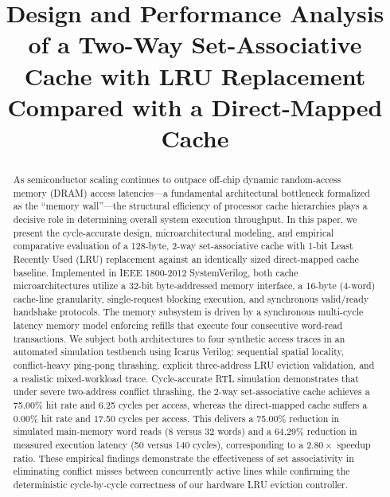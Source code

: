 \documentclass[conference]{IEEEtran}
\begin{document}
\title{Design and Performance Analysis of a Two-Way Set-Associative Cache with LRU Replacement Compared with a Direct-Mapped Cache}

\author{
}

\maketitle

\begin{abstract}
As semiconductor scaling continues to outpace off-chip dynamic random-access memory (DRAM) access latencies---a fundamental architectural bottleneck formalized as the ``memory wall''---the structural efficiency of processor cache hierarchies plays a decisive role in determining overall system execution throughput. In this paper, we present the cycle-accurate design, microarchitectural modeling, and empirical comparative evaluation of a 128-byte, 2-way set-associative cache with 1-bit Least Recently Used (LRU) replacement against an identically sized direct-mapped cache baseline. Implemented in IEEE 1800-2012 SystemVerilog, both cache microarchitectures utilize a 32-bit byte-addressed memory interface, a 16-byte (4-word) cache-line granularity, single-request blocking execution, and synchronous valid/ready handshake protocols. The memory subsystem is driven by a synchronous multi-cycle latency memory model enforcing refills that execute four consecutive word-read transactions. We subject both architectures to four synthetic access traces in an automated simulation testbench using Icarus Verilog: sequential spatial locality, conflict-heavy ping-pong thrashing, explicit three-address LRU eviction validation, and a realistic mixed-workload trace. Cycle-accurate RTL simulation demonstrates that under severe two-address conflict thrashing, the 2-way set-associative cache achieves a 75.00\% hit rate and 6.25 cycles per access, whereas the direct-mapped cache suffers a 0.00\% hit rate and 17.50 cycles per access. This delivers a 75.00\% reduction in simulated main-memory word reads (8 versus 32 words) and a 64.29\% reduction in measured execution latency (50 versus 140 cycles), corresponding to a $2.80\times$ speedup ratio. These empirical findings demonstrate the effectiveness of set associativity in eliminating conflict misses between concurrently active lines while confirming the deterministic cycle-by-cycle correctness of our hardware LRU eviction controller.
\end{abstract}
\end{document}

